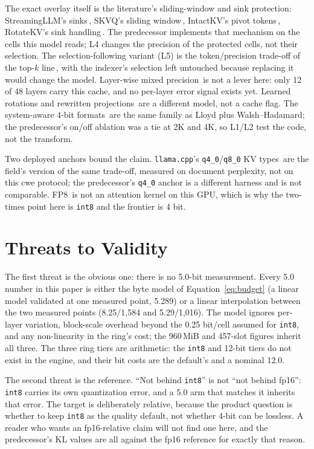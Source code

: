 \documentclass[10pt,twocolumn]{article}
\begin{document}
The exact overlay itself is the literature's sliding-window and sink protection: StreamingLLM's sinks\,\cite{streamingllm}, SKVQ's sliding window\,\cite{skvq}, IntactKV's pivot tokens\,\cite{intactkv}, RotateKV's sink handling\,\cite{rotatekv}. The predecessor implements that mechanism on the cells this model reads; L4 changes the precision of the protected cells, not their selection. The selection-following variant (L5) is the token/precision trade-off of the top-$k$ line\,\cite{top-k}, with the indexer's selection left untouched because replacing it would change the model. Layer-wise mixed precision\,\cite{kvtuner} is not a lever here: only 12 of 48 layers carry this cache, and no per-layer error signal exists yet. Learned rotations and rewritten projections\,\cite{quarot,spinquant,palu} are a different model, not a cache flag. The system-aware 4-bit formats\,\cite{sawint4} are the same family as Lloyd plus Walsh--Hadamard; the predecessor's on/off ablation was a tie at 2K and 4K, so L1/L2 test the code, not the transform.

Two deployed anchors bound the claim. \texttt{llama.cpp}'s \texttt{q4\_0}/\texttt{q8\_0} KV types\,\cite{llama-cpp} are the field's version of the same trade-off, measured on document perplexity, not on this cwe protocol; the predecessor's \texttt{q4\_0} anchor is a different harness and is not comparable. FP8\,\cite{vllm-fp8} is not an attention kernel on this GPU, which is why the two-times point here is \texttt{int8} and the frontier is 4 bit.

\section{Threats to Validity}\label{sec:threats}

The first threat is the obvious one: there is no 5.0-bit measurement. Every 5.0 number in this paper is either the byte model of Equation~\ref{eq:budget} (a linear model validated at one measured point, 5.289) or a linear interpolation between the two measured points (8.25/1,584 and 5.29/1,016). The model ignores per-layer variation, block-scale overhead beyond the 0.25 bit/cell assumed for \texttt{int8}, and any non-linearity in the ring's cost; the 960\,MiB and 457-slot figures inherit all three. The three ring tiers are arithmetic: the \texttt{int8} and 12-bit tiers do not exist in the engine, and their bit costs are the default's and a nominal 12.0.

The second threat is the reference. ``Not behind \texttt{int8}'' is not ``not behind fp16'': \texttt{int8} carries its own quantization error, and a 5.0 arm that matches it inherits that error. The target is deliberately relative, because the product question is whether to keep \texttt{int8} as the quality default, not whether 4-bit can be lossless. A reader who wants an fp16-relative claim will not find one here, and the predecessor's KL values are all against the fp16 reference for exactly that reason.
\end{document}
